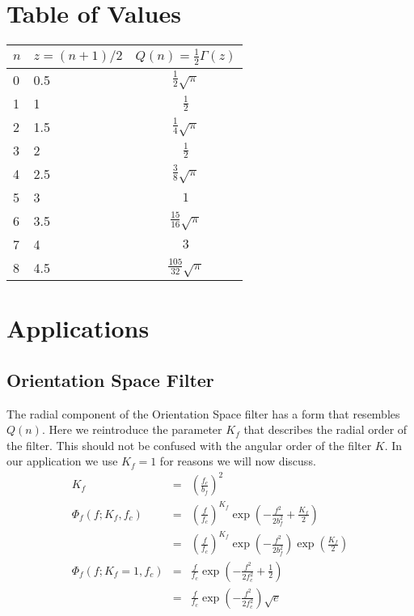 \documentclass{article}
\begin{document}
\section{Table of Values}
\renewcommand{\arraystretch}{1.5}
\begin{tabular}{l|l||c}
\hline
$ n $ & $ z = (n+1)/2 $ & $ Q(n) = \frac{1}{2} \Gamma(z) $ \\ \hline \hline
0 & 0.5 & $ \frac{1}{2} \sqrt{\pi} $ \\
1 & 1 & $ \frac{1}{2} $ \\ %
2 & 1.5 & $ \frac{1}{4} \sqrt{\pi} $ \\ %
3 & 2 & $ \frac{1}{2} $ \\ %
4 & 2.5 & $ \frac{3}{8} \sqrt{\pi} $  \\ %
5 & 3 & $ 1 $   \\ %
6 & 3.5 & $ \frac{15}{16} \sqrt{\pi} $ \\ %
7 & 4 & $ 3 $ \\ %
8 & 4.5 & $ \frac{105}{32} \sqrt{\pi} $ \\ %
\end{tabular}

\section{Applications}
\subsection{Orientation Space Filter}
The radial component of the Orientation Space filter has a form that resembles $ Q(n) $. Here  we reintroduce the parameter $ K_f $ that describes the radial order of the filter. This should not be confused with the angular order of the filter $ K $. In our application we use $ K_f = 1 $ for reasons we will now discuss.
\begin{eqnarray}
K_f & = & \left(\frac{f_c}{b_f} \right)^2 \\
\Phi_f(f; K_f, f_c) & = & \left(\frac{f}{f_c}\right)^{K_f}
       \exp\left(-\frac{f^2}{2b_f^2}+\frac{K_f}{2}\right) \\
 & = & \left(\frac{f}{f_c}\right)^{K_f}
       \exp\left(-\frac{f^2}{2b_f^2}\right)
       \exp\left(\frac{K_f}{2}\right) \\ 
\Phi_f(f; K_f = 1, f_c) & = & \frac{f}{f_c}
    \exp\left(-\frac{f^2}{2f_c^2}+\frac{1}{2}\right) \\
    & = &
    \frac{f}{f_c}
    \exp\left(-\frac{f^2}{2f_c^2}\right)
    \sqrt{e}
 \end{eqnarray}
\end{document}
